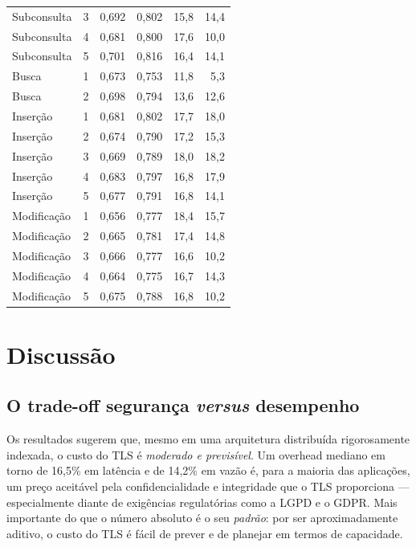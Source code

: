 \documentclass[12pt]{article}
\begin{document}
\begin{table}[htbp]
\begin{tabular}{@{}llrrrr@{}}
Subconsulta & 3 & 0,692 & 0,802 & 15,8 & 14,4 \\
Subconsulta & 4 & 0,681 & 0,800 & 17,6 & 10,0 \\
Subconsulta & 5 & 0,701 & 0,816 & 16,4 & 14,1 \\
\midrule
Busca & 1 & 0,673 & 0,753 & 11,8 & \phantom{0}5,3 \\
Busca & 2 & 0,698 & 0,794 & 13,6 & 12,6 \\
\midrule
Inserção & 1 & 0,681 & 0,802 & 17,7 & 18,0 \\
Inserção & 2 & 0,674 & 0,790 & 17,2 & 15,3 \\
Inserção & 3 & 0,669 & 0,789 & 18,0 & 18,2 \\
Inserção & 4 & 0,683 & 0,797 & 16,8 & 17,9 \\
Inserção & 5 & 0,677 & 0,791 & 16,8 & 14,1 \\
\midrule
Modificação & 1 & 0,656 & 0,777 & 18,4 & 15,7 \\
Modificação & 2 & 0,665 & 0,781 & 17,4 & 14,8 \\
Modificação & 3 & 0,666 & 0,777 & 16,6 & 10,2 \\
Modificação & 4 & 0,664 & 0,775 & 16,7 & 14,3 \\
Modificação & 5 & 0,675 & 0,788 & 16,8 & 10,2 \\
\bottomrule
\end{tabular}
\end{table}


\section{Discussão}
\label{sec:discussao}

\subsection{O trade-off segurança \emph{versus} desempenho}

Os resultados sugerem que, mesmo em uma arquitetura distribuída rigorosamente indexada, o custo do TLS é
\emph{moderado e previsível}. Um overhead mediano em torno de 16,5\% em latência
e de 14,2\% em vazão é, para a maioria das aplicações, um preço aceitável pela
confidencialidade e integridade que o TLS proporciona --- especialmente diante de
exigências regulatórias como a LGPD e o GDPR. Mais importante do que o número
absoluto é o seu \emph{padrão}: por ser aproximadamente aditivo, o custo do TLS é
fácil de prever e de planejar em termos de capacidade.
\end{document}
